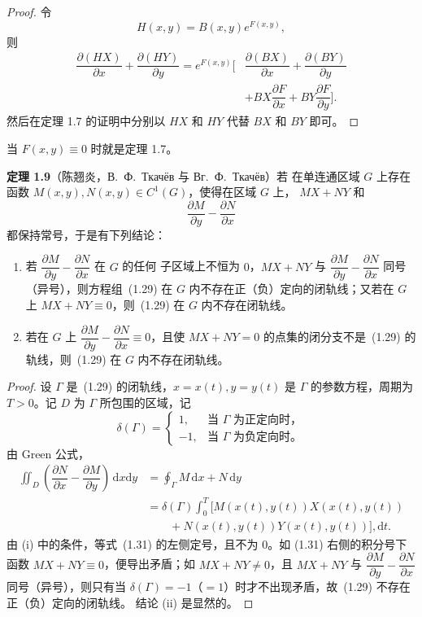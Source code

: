 \begin{proof}
令
\[
  H(x,y)=B(x,y)e^{F(x,y)},
\]
则
\[
\begin{aligned}
  \dfrac{\partial(HX)}{\partial x}+\dfrac{\partial(HY)}{\partial y}
  =e^{F(x,y)}\bigg[&\dfrac{\partial(BX)}{\partial x}
  +\dfrac{\partial(BY)}{\partial y}\\
  &+BX\dfrac{\partial F}{\partial x}
  +BY\dfrac{\partial F}{\partial y}\bigg].
\end{aligned}
\]
然后在定理 1.7 的证明中分别以 $HX$ 和 $HY$ 代替 $BX$ 和 $BY$ 即可。
\end{proof}

当 $F(x,y)\equiv0$ 时就是定理 1.7。

\noindent\textbf{定理 1.9}\quad （陈翘炎\cite{22}，В.~Ф.~Ткачёв 与 Вг.~Ф.~Ткачёв\cite{20}）若
在单连通区域 $G$ 上存在函数 $M(x,y),N(x,y)\in C^1(G)$，使得在区域 $G$ 上，
$MX+NY$ 和
\[
  \dfrac{\partial M}{\partial y}-\dfrac{\partial N}{\partial x}
\]
都保持常号，于是有下列结论：
\begin{enumerate}
  \item 若 $\dfrac{\partial M}{\partial y}-\dfrac{\partial N}{\partial x}$ 在 $G$ 的任何
  子区域上不恒为 $0$，$MX+NY$ 与 $\dfrac{\partial M}{\partial y}-\dfrac{\partial N}{\partial x}$
  同号（异号），则方程组~(1.29) 在 $G$ 内不存在正（负）定向的闭轨线；又若在 $G$ 上
  $MX+NY\equiv0$，则~(1.29) 在 $G$ 内不存在闭轨线。
  \item 若在 $G$ 上 $\dfrac{\partial M}{\partial y}-\dfrac{\partial N}{\partial x}\equiv0$，且使
  $MX+NY=0$ 的点集的闭分支不是~(1.29) 的轨线，则~(1.29) 在 $G$ 内不存在闭轨线。
\end{enumerate}

\begin{proof}
设 $\Gamma$ 是~(1.29) 的闭轨线，$x=x(t),y=y(t)$ 是 $\Gamma$ 的参数方程，周期为
$T>0$。记 $D$ 为 $\Gamma$ 所包围的区域，记
\[
  \delta(\Gamma)=\begin{cases}
    1,&\text{当 $\Gamma$ 为正定向时，}\\
    -1,&\text{当 $\Gamma$ 为负定向时。}
  \end{cases}
\]
由 Green 公式，
\[
\begin{aligned}
  \iint_D\left(\dfrac{\partial N}{\partial x}
  -\dfrac{\partial M}{\partial y}\right)\,\mathrm{d}x\mathrm{d}y
  &=\oint_\Gamma M\,\mathrm{d}x+N\,\mathrm{d}y\\
  &=\delta(\Gamma)\int_0^T[M(x(t),y(t))X(x(t),y(t))\\
  &\qquad+N(x(t),y(t))Y(x(t),y(t))],\mathrm{d}t.
\end{aligned}
\]
由 (i) 中的条件，等式~(1.31) 的左侧定号，且不为 $0$。如 (1.31) 右侧的积分号下
函数 $MX+NY\equiv0$，便导出矛盾；如 $MX+NY\ne0$，且 $MX+NY$ 与
$\dfrac{\partial M}{\partial y}-\dfrac{\partial N}{\partial x}$ 同号（异号），则只有当
$\delta(\Gamma)=-1$（$=1$）时才不出现矛盾，故~(1.29) 不存在正（负）定向的闭轨线。
结论 (ii) 是显然的。
\end{proof}

